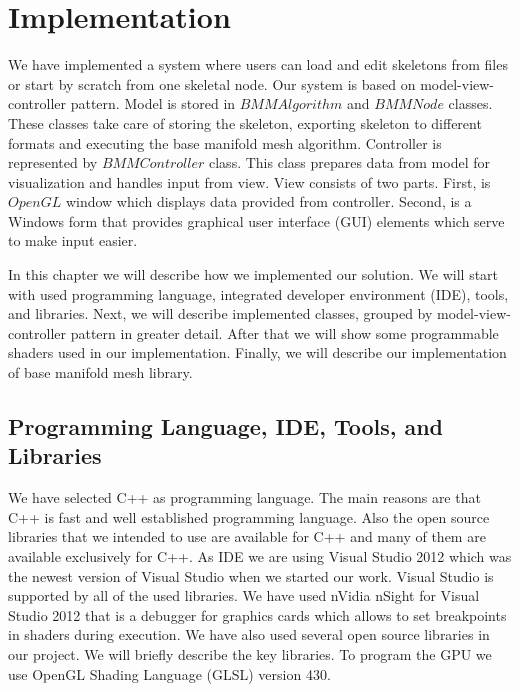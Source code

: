 \chapter{Implementation}

We have implemented a system where users can load and edit skeletons from files or start by scratch from one skeletal node.
Our system is based on model-view-controller pattern.
Model is stored in $BMMAlgorithm$ and $BMMNode$ classes.
These classes take care of storing the skeleton, exporting skeleton to different formats and executing the base manifold mesh algorithm.
Controller is represented by $BMMController$ class.
This class prepares data from model for visualization and handles input from view.
View consists of two parts.
First, is $OpenGL$ window which displays data provided from controller.
Second, is a Windows form that provides graphical user interface (GUI) elements which serve to make input easier.

In this chapter we will describe how we implemented our solution.
We will start with used programming language, integrated developer environment (IDE), tools, and libraries.
Next, we will describe implemented classes, grouped by model-view-controller pattern in greater detail.
After that we will show some programmable shaders used in our implementation.
Finally, we will describe our implementation of base manifold mesh library.

\section{Programming Language, IDE, Tools, and Libraries}

We have selected C++ as programming language.
The main reasons are that C++ is fast and well established programming language.
Also the open source libraries that we intended to use are available for C++ and many of them are available exclusively for C++.
As IDE we are using Visual Studio 2012 which was the newest version of Visual Studio when we started our work.
Visual Studio is supported by all of the used libraries.
We have used nVidia nSight for Visual Studio 2012 that is a debugger for graphics cards which allows to set breakpoints in shaders during execution. We have also used several open source libraries in our project. We will briefly describe the key libraries.
To program the GPU we use OpenGL Shading Language (GLSL) version 430.

